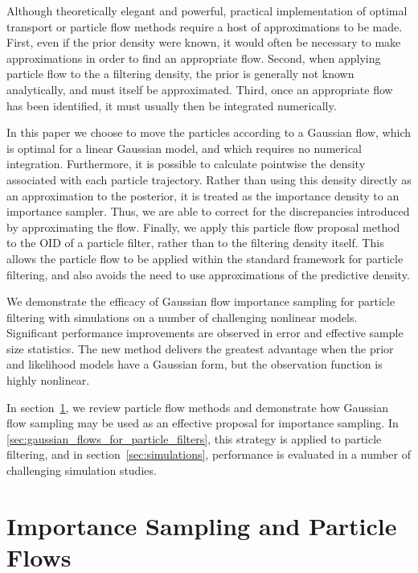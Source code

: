 \documentclass{article}
\begin{document}
Although theoretically elegant and powerful, practical implementation of optimal transport or particle flow methods require a host of approximations to be made. First, even if the prior density were known, it would often be necessary to make approximations in order to find an appropriate flow. Second, when applying particle flow to the a filtering density, the prior is generally not known analytically, and must itself be approximated. Third, once an appropriate flow has been identified, it must usually then be integrated numerically.

In this paper we choose to move the particles according to a Gaussian flow, which is optimal for a linear Gaussian model, and which requires no numerical integration. Furthermore, it is possible to calculate pointwise the density associated with each particle trajectory. Rather than using this density directly as an approximation to the posterior, it is treated as the importance density to an importance sampler. Thus, we are able to correct for the discrepancies introduced by approximating the flow. Finally, we apply this particle flow proposal method to the OID of a particle filter, rather than to the filtering density itself. This allows the particle flow to be applied within the standard framework for particle filtering, and also avoids the need to use approximations of the predictive density.

We demonstrate the efficacy of Gaussian flow importance sampling for particle filtering with simulations on a number of challenging nonlinear models. Significant performance improvements are observed in error and effective sample size statistics. The new method delivers the greatest advantage when the prior and likelihood models have a Gaussian form, but the observation function is highly nonlinear.

In section~\ref{sec:gaussian_flows}, we review particle flow methods and demonstrate how Gaussian flow sampling may be used as an effective proposal for importance sampling. In \ref{sec:gaussian_flows_for_particle_filters}, this strategy is applied to particle filtering, and in section~\ref{sec:simulations}, performance is evaluated in a number of challenging simulation studies.


\section{Importance Sampling and Particle Flows} \label{sec:gaussian_flows}
\end{document}
